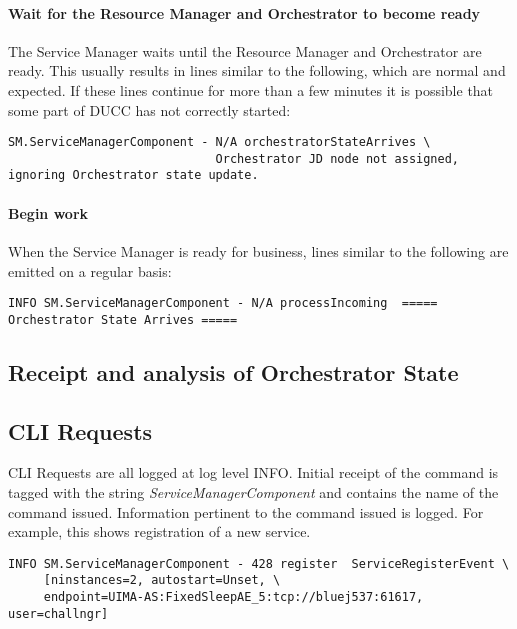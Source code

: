     \paragraph{Wait for the Resource Manager and Orchestrator to become ready}

    The Service Manager waits until the Resource Manager and Orchestrator are ready.  This usually
    results in lines similar to the following, which are normal and expected.  If these lines
    continue for more than a few minutes it is possible that some part of DUCC has not correctly
    started:
\begin{verbatim}
SM.ServiceManagerComponent - N/A orchestratorStateArrives \
                             Orchestrator JD node not assigned, ignoring Orchestrator state update.
\end{verbatim}

    \paragraph{Begin work}
    When the Service Manager is ready for business, lines similar to the following are emitted on
    a regular basis:
\begin{verbatim}
INFO SM.ServiceManagerComponent - N/A processIncoming  ===== Orchestrator State Arrives =====
\end{verbatim}

\subsection{Receipt and analysis of Orchestrator State}

\subsection{CLI Requests}

   CLI Requests are all logged at log level INFO.  Initial receipt of the command
   is tagged with the string {\em ServiceManagerComponent} and contains the name of 
   the command issued.  Information pertinent to the command issued is logged. 
   For example, this shows registration of a new service.

\begin{verbatim}
INFO SM.ServiceManagerComponent - 428 register  ServiceRegisterEvent \
     [ninstances=2, autostart=Unset, \
     endpoint=UIMA-AS:FixedSleepAE_5:tcp://bluej537:61617, user=challngr]
\end{verbatim}

